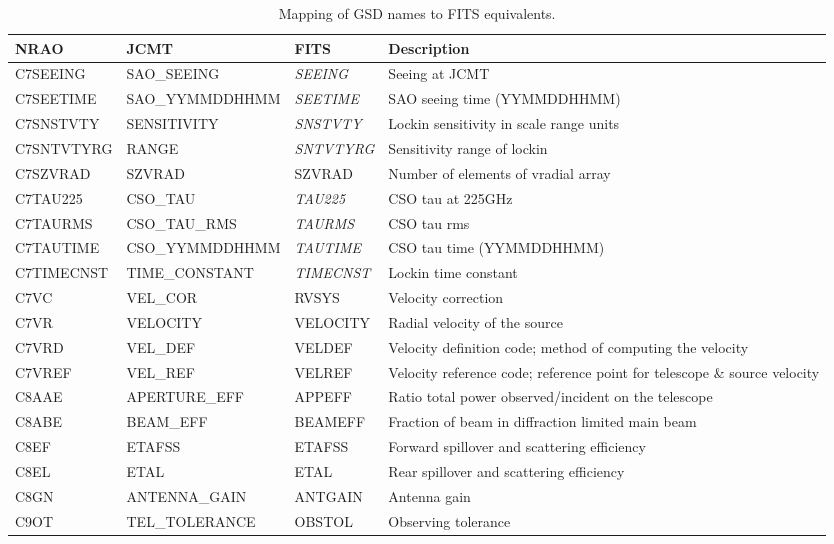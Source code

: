 \begin{sidewaystable*}
\begin{center}
\begin{tabular}{llll}
\hline
\end{tabular}
\end{center}
\end{sidewaystable*}


\begin{sidewaystable*}
\caption{Mapping of GSD names to FITS equivalents.}
\begin{center}
\small
\begin{tabular}{llll}
\hline
NRAO & JCMT & FITS & Description\\ \hline

C7SEEING & SAO\_SEEING & \emph{SEEING} & Seeing at JCMT\\
C7SEETIME & SAO\_YYMMDDHHMM & \emph{SEETIME} & SAO seeing time (YYMMDDHHMM)\\
C7SNSTVTY & SENSITIVITY & \emph{SNSTVTY} & Lockin sensitivity in scale range units\\
C7SNTVTYRG & RANGE & \emph{SNTVTYRG} & Sensitivity range of lockin\\
C7SZVRAD & SZVRAD & SZVRAD & Number of elements of vradial array\\
C7TAU225 & CSO\_TAU & \emph{TAU225} & CSO tau at 225GHz\\
C7TAURMS & CSO\_TAU\_RMS & \emph{TAURMS} & CSO tau rms\\
C7TAUTIME & CSO\_YYMMDDHHMM & \emph{TAUTIME} & CSO tau time (YYMMDDHHMM)\\
C7TIMECNST & TIME\_CONSTANT & \emph{TIMECNST} & Lockin time constant\\
C7VC & VEL\_COR & RVSYS & Velocity correction\\
C7VR & VELOCITY & VELOCITY & Radial velocity of the source\\
C7VRD & VEL\_DEF & VELDEF & Velocity definition code; method of computing the velocity\\
C7VREF & VEL\_REF & VELREF & Velocity reference code; reference point for telescope \& source velocity\\
C8AAE & APERTURE\_EFF & APPEFF & Ratio total power observed/incident on the telescope\\
C8ABE & BEAM\_EFF & BEAMEFF & Fraction of beam in diffraction limited main beam\\
C8EF & ETAFSS & ETAFSS & Forward spillover and scattering efficiency\\
C8EL & ETAL & ETAL & Rear spillover and scattering efficiency\\
C8GN & ANTENNA\_GAIN & ANTGAIN & Antenna gain\\
C9OT & TEL\_TOLERANCE & OBSTOL & Observing tolerance\\

\end{tabular}
\end{center}
\end{sidewaystable*}
